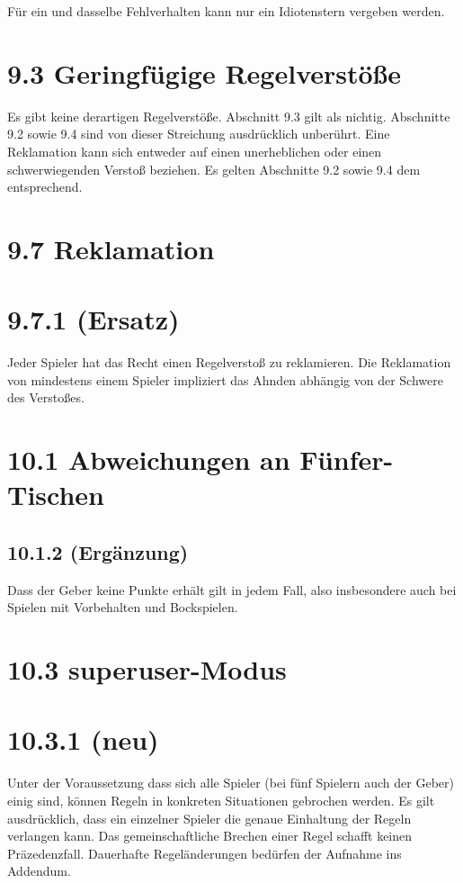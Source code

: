 Für ein und dasselbe Fehlverhalten kann nur ein Idiotenstern vergeben werden.

\clearpage

\section*{9.3 Geringfügige Regelverstöße}

Es gibt keine derartigen Regelverstöße. Abschnitt 9.3 gilt als nichtig.
Abschnitte 9.2 sowie 9.4 sind von dieser Streichung ausdrücklich unberührt.
Eine Reklamation kann sich entweder auf einen unerheblichen oder einen
schwerwiegenden Verstoß beziehen. Es gelten Abschnitte 9.2 sowie 9.4 dem
entsprechend.

\section*{9.7 Reklamation}

\section*{9.7.1 (Ersatz)}

Jeder Spieler hat das Recht einen Regelverstoß zu reklamieren. Die Reklamation
von mindestens einem Spieler impliziert das Ahnden abhängig von der Schwere des
Verstoßes.

\section*{10.1 Abweichungen an Fünfer-Tischen}

\subsection*{10.1.2 (Ergänzung)}

Dass der Geber keine Punkte erhält gilt in jedem Fall, also insbesondere auch
bei Spielen mit Vorbehalten und Bockspielen.

\section*{10.3 superuser-Modus}

\section*{10.3.1 (neu)}

Unter der Voraussetzung dass sich alle Spieler (bei fünf Spielern auch der
Geber) einig sind, können Regeln in konkreten Situationen gebrochen werden. Es
gilt ausdrücklich, dass ein einzelner Spieler die genaue Einhaltung der Regeln
verlangen kann. Das gemeinschaftliche Brechen einer Regel schafft keinen
Präzedenzfall. Dauerhafte Regeländerungen bedürfen der Aufnahme ins Addendum.

